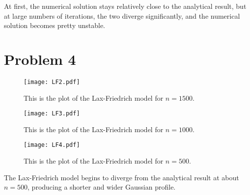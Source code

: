\documentclass[11pt,letterpaper]{article}
\begin{document}
At first, the numerical solution stays relatively close to the analytical result, but at large numbers of iterations, the two diverge significantly, and the numerical solution becomes pretty unstable.

\section*{Problem 4}

\begin{figure}[bth]
\centering
\texttt{[image: LF2.pdf]}
\caption{This is the plot of the Lax-Friedrich model for $n=1500$.}
\label{fig:simpleplot}
\end{figure}

\begin{figure}[bth]
\centering
\texttt{[image: LF3.pdf]}
\caption{This is the plot of the Lax-Friedrich model for $n=1000$.}
\label{fig:simpleplot}
\end{figure}

\begin{figure}[bth]
\centering
\texttt{[image: LF4.pdf]}
\caption{This is the plot of the Lax-Friedrich model for $n=500$.}
\label{fig:simpleplot}
\end{figure}

The Lax-Friedrich model begins to diverge from the analytical result at about $n=500$, producing a shorter and wider Gaussian profile.
\end{document}
